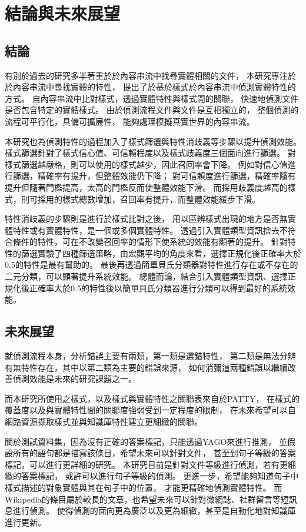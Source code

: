 %
%
%
\chapter{結論與未來展望}
\label{c:future}

\section{結論}
有別於過去的研究多半著重於於內容串流中找尋實體相關的文件，
本研究專注於於內容串流中尋找實體的特性，
提出了於基於樣式於內容串流中偵測實體特性的方式。
自內容串流中比對樣式，透過實體特性與樣式間的關聯，
快速地偵測文件是否包含特定的實體樣式。
由於偵測流程文件與文件是互相獨立的，
整個偵測的流程可平行化，具備可擴展性，
能夠處理模擬真實世界的內容串流。

本研究也為偵測特性的過程加入了樣式篩選與特性消歧義等步驟以提升偵測效能。
樣式篩選針對了樣式信心值、可信賴程度以及樣式歧義度三個面向進行篩選。
對樣式篩選越嚴格，則可以使用的樣式越少，因此召回率會下降。
例如對信心值進行篩選，精確率有提升，但整體效能仍下降；
對可信賴度進行篩選，精確率隨有提升但隨著門檻提高，太高的門檻反而使整體效能下滑。
而採用歧義度越高的樣式，則可採用的樣式總數增加，召回率有提升，而整體效能緩步下滑。

特性消歧義的步驟則是進行於樣式比對之後，
用以區辨樣式出現的地方是否無實體特性或有實體特性，是一個或多個實體特性。
透過引入實體類型資訊捨去不符合條件的特性，可在不改變召回率的情形下使系統的效能有顯著的提升。
針對特性的篩選實驗了四種篩選策略，由宏觀平均的角度來看，選擇正規化後正確率大於0.5的特性是最有幫助的。
最後再透過簡單貝氏分類器對特性進行存在或不存在的二元分類，可以顯著提升系統效能。
總體而論，結合引入實體類型資訊、選擇正規化後正確率大於0.5的特性後以簡單貝氏分類器進行分類可以得到最好的系統效能。

\section{未來展望}
就偵測流程本身，分析錯誤主要有兩類，第一類是選錯特性，
第二類是無法分辨有無特性存在，其中以第二類為主要的錯誤來源，
如何消彌這兩種錯誤以繼續改善偵測效能是未來的研究課題之一。

而本研究所使用之樣式，以及樣式與實體特性之關聯表來自於PATTY，
在樣式的覆蓋度以及與實體特性間的關聯度強弱受到一定程度的限制，
在未來希望可以自網路資源擷取樣式並與知識庫特性建立更細緻的關聯。

關於測試資料集，因為沒有正確的答案標記，只能透過YAGO來進行推測，
並假設所有的語句都是描寫該條目，希望未來可以針對文件，
甚至到句子等級的答案標記，可以進行更詳細的研究。
本研究目前是針對文件等級進行偵測，若有更細緻的答案標記，
或許可以進行句子等級的偵測。
更進一步，希望能夠知道句子中樣式描述的對象實體與其在句子中的位置，
才能更精確地偵測實體特性。
而Wikipedia的條目屬於較長的文章，也希望未來可以針對微網誌、社群留言等短訊息進行偵測。
使得偵測的面向更為廣泛以及更為細緻，甚至是自動化地對知識庫進行更新。

